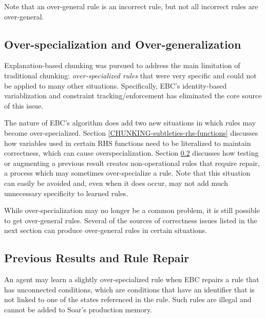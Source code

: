 Note that an over-general rule is an incorrect rule, but not all incorrect rules are over-general.

\subsection{Over-specialization and Over-generalization}
\label{CHUNKING-subtleties-overspecialization}

Explanation-based chunking was pursued to address the main limitation of traditional chunking:  \textit{over-specialized rules} that were very specific and could not be applied to many other situations. Specifically, EBC's identity-based variablization and constraint tracking/enforcement has eliminated the core source of this issue.

The nature of EBC's algorithm does add two new situations in which rules may become over-specialized.  Section \ref{CHUNKING-subtleties-rhs-functions} discusses how variables used in certain RHS functions need to be literalized to maintain correctness, which can cause overspecialization. Section \ref{CHUNKING-subtleties-repair} discusses how testing or augmenting a previous result creates non-operational rules that require repair, a process which may sometimes over-specialize a rule.  Note that this situation can easily be avoided and, even when it does occur, may not add much unnecessary specificity to learned rules.

While over-specialization may no longer be a common problem, it is still possible to get over-general rules.  Several of the sources of correctness issues listed in the next section can produce over-general rules in certain situations.

\subsection{Previous Results and Rule Repair}
\label{CHUNKING-subtleties-repair}

An agent may learn a slightly over-specialized rule when EBC repairs a rule that has unconnected conditions, which are conditions that have an identifier that is not linked to one of the states referenced in the rule.  Such rules are illegal and cannot be added to Soar's production memory.

